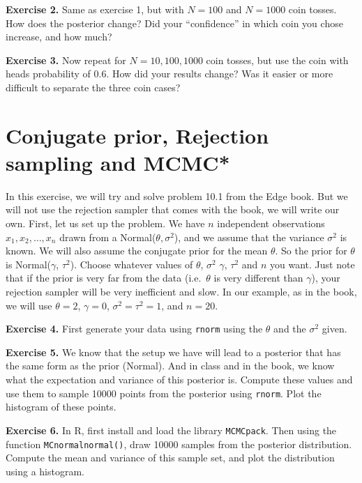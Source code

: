 \documentclass[
]{book}
\begin{document}
\textbf{Exercise 2.} Same as exercise 1, but with \(N=100\) and \(N=1000\) coin tosses. How does the posterior change? Did your ``confidence'' in which coin you chose increase, and how much?

\textbf{Exercise 3.} Now repeat for \(N=10, 100, 1000\) coin tosses, but use the coin with heads probability of 0.6. How did your results change? Was it easier or more difficult to separate the three coin cases?

\hypertarget{conjugate-prior-rejection-sampling-and-mcmc}{%
\section{Conjugate prior, Rejection sampling and MCMC*}\label{conjugate-prior-rejection-sampling-and-mcmc}}

In this exercise, we will try and solve problem 10.1 from the Edge book. But we will not use the rejection sampler that comes with the book, we will write our own. First, let us set up the problem. We have \(n\) independent observations \(x_1, x_2, \dots, x_n\) drawn from a Normal(\(\theta, \sigma^2\)), and we assume that the variance \(\sigma^2\) is known. We will also assume the conjugate prior for the mean \(\theta\). So the prior for \(\theta\) is Normal(\(\gamma\), \(\tau^2\)). Choose whatever values of \(\theta\), \(\sigma^2\) \(\gamma\), \(\tau^2\) and \(n\) you want. Just note that if the prior is very far from the data (i.e.~\(\theta\) is very different than \(\gamma\)), your rejection sampler will be very inefficient and slow. In our example, as in the book, we will use \(\theta = 2\), \(\gamma=0\), \(\sigma^2 = \tau^2 = 1\), and \(n=20\).

\textbf{Exercise 4.} First generate your data using \texttt{rnorm} using the \(\theta\) and the \(\sigma^2\) given.

\textbf{Exercise 5.} We know that the setup we have will lead to a posterior that has the same form as the prior (Normal). And in class and in the book, we know what the expectation and variance of this posterior is. Compute these values and use them to sample 10000 points from the posterior using \texttt{rnorm}. Plot the histogram of these points.

\textbf{Exercise 6.} In R, first install and load the library \texttt{MCMCpack}. Then using the function \texttt{MCnormalnormal()}, draw 10000 samples from the posterior distribution. Compute the mean and variance of this sample set, and plot the distribution using a histogram.
\end{document}
